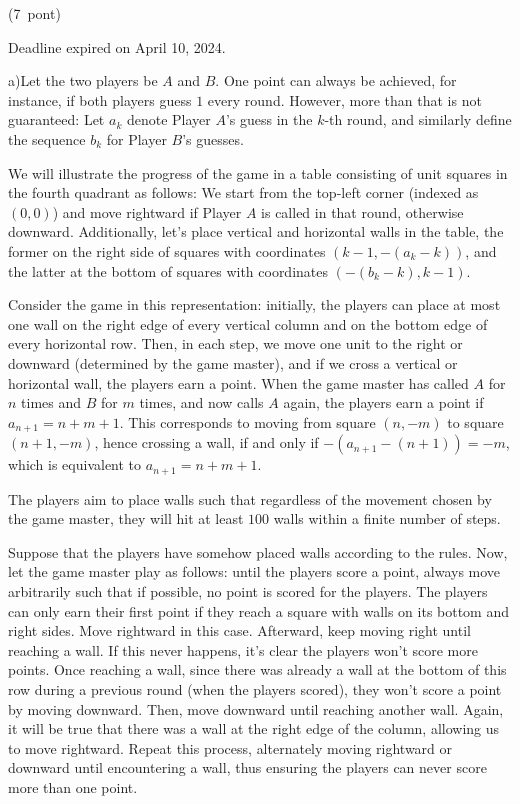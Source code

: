 \documentclass{article}
\begin{document}
(7 pont)

Deadline expired on April 10, 2024.

a)Let the two players be \(\displaystyle A\) and \(\displaystyle B\). One point can always be achieved, for instance, if both players guess \(\displaystyle 1\) every round. However, more than that is not guaranteed: Let \(\displaystyle a_k\) denote Player \(\displaystyle A\)'s guess in the \(\displaystyle k\)-th round, and similarly define the sequence \(\displaystyle b_k\) for Player \(\displaystyle B\)'s guesses.

We will illustrate the progress of the game in a table consisting of unit squares in the fourth quadrant as follows: We start from the top-left corner (indexed as \(\displaystyle (0,0)\)) and move rightward if Player \(\displaystyle A\) is called in that round, otherwise downward. Additionally, let's place vertical and horizontal walls in the table, the former on the right side of squares with coordinates \(\displaystyle (k-1,-(a_k-k))\), and the latter at the bottom of squares with coordinates \(\displaystyle (-(b_k-k),k-1)\).

Consider the game in this representation: initially, the players can place at most one wall on the right edge of every vertical column and on the bottom edge of every horizontal row. Then, in each step, we move one unit to the right or downward (determined by the game master), and if we cross a vertical or horizontal wall, the players earn a point. When the game master has called \(\displaystyle A\) for \(\displaystyle n\) times and \(\displaystyle B\) for \(\displaystyle m\) times, and now calls \(\displaystyle A\) again, the players earn a point if \(\displaystyle a_{n+1}=n+m+1\). This corresponds to moving from square \(\displaystyle (n,-m)\) to square \(\displaystyle (n+1,-m)\), hence crossing a wall, if and only if \(\displaystyle -(a_{n+1}-(n+1))=-m\), which is equivalent to  \(\displaystyle a_{n+1}=n+m+1\).

The players aim to place walls such that regardless of the movement chosen by the game master, they will hit at least \(\displaystyle 100\) walls within a finite number of steps.

Suppose that the players have somehow placed walls according to the rules. Now, let the game master play as follows: until the players score a point, always move arbitrarily such that if possible, no point is scored for the players. The players can only earn their first point if they reach a square with walls on its bottom and right sides. Move rightward in this case. Afterward, keep moving right until reaching a wall. If this never happens, it's clear the players won't score more points. Once reaching a wall, since there was already a wall at the bottom of this row during a previous round (when the players scored), they won't score a point by moving downward. Then, move downward until reaching another wall. Again, it will be true that there was a wall at the right edge of the column, allowing us to move rightward. Repeat this process, alternately moving rightward or downward until encountering a wall, thus ensuring the players can never score more than one point.
\end{document}
